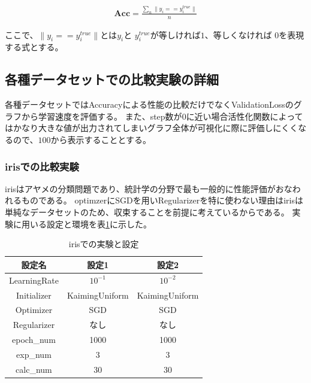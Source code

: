\begin{eqnarray}
\mathbf{Acc} = \frac{\sum_n \|y_i == y_i^{true}\|}{n}
\label{eq:accuracy}
\end{eqnarray}

ここで、$ \|y_i == y_i^{true}\| $とは$ y_i $と $ y_i^{true} $が等しければ$ 1 $、等しくなければ $ 0 $を表現する式とする。

\subsection{各種データセットでの比較実験の詳細}

各種データセットではAccuracyによる性能の比較だけでなくValidationLossのグラフから学習速度を評価する。
また、step数が$0$に近い場合活性化関数によってはかなり大きな値が出力されてしまいグラフ全体が可視化に際に評価しにくくなるので、$100$から表示することとする。

\subsubsection{irisでの比較実験}
\label{impl:iris}

irisはアヤメの分類問題であり、統計学の分野で最も一般的に性能評価がおなわれるものである。
optimzerにSGDを用いRegularizerを特に使わない理由はirisは単純なデータセットのため、収束することを前提に考えているからである。
実験に用いる設定と環境を表\ref{exp:iris}に示した。


\begin{table}[htbp]
\label{exp:iris}
    \begin{center}
        \caption{irisでの実験と設定}
        \label{exp:iris}
        \vspace{2mm} 
        \begin{tabular}{ |c|c|c| }
        \hline
        設定名 & 設定1 & 設定2 \\
        \hline
        LearningRate         & $ 10^{-1} $ & $ 10^{-2} $ \\
        \hline
        Initializer       & KaimingUniform &  KaimingUniform \\
        \hline
        Optimizer           & SGD & SGD \\
        \hline
        Regularizer     & なし & なし \\
        \hline
        epoch\_num       & 1000 &  1000 \\
        \hline
        exp\_num         & 3 & 3 \\
        \hline
        calc\_num        & 30 & 30 \\
        \hline
        \end{tabular}
    \end{center}
\end{table}



